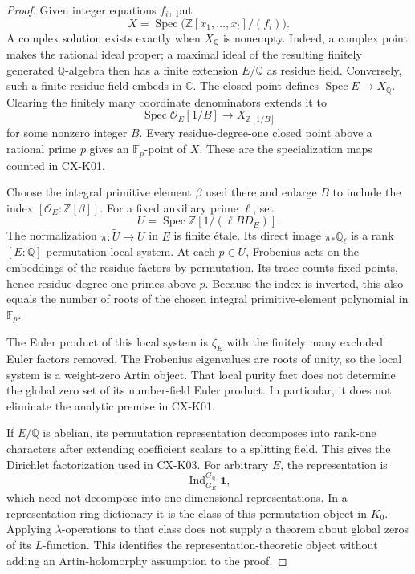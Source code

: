 \documentclass[11pt,a4paper]{article}
\begin{document}
\begin{proof}
Given integer equations $f_i$, put
\[
 X=\operatorname{Spec}\bigl(\mathbb Z[x_1,\ldots,x_t]/(f_i)\bigr).
\]
A complex solution exists exactly when $X_{\mathbb Q}$ is nonempty.
Indeed, a complex point makes the rational ideal proper; a maximal
ideal of the resulting finitely generated $\mathbb Q$-algebra then
has a finite extension $E/\mathbb Q$ as residue field. Conversely,
such a finite residue field embeds in $\mathbb C$. The closed point
defines $\operatorname{Spec}E\to X_{\mathbb Q}$. Clearing the finitely
many coordinate denominators extends it to
\[
 \operatorname{Spec}\mathcal O_E[1/B]
     \longrightarrow X_{\mathbb Z[1/B]}
\]
for some nonzero integer $B$. Every residue-degree-one closed point
above a rational prime $p$ gives an $\mathbb F_p$-point of $X$.
These are the specialization maps counted in CX-K01.

Choose the integral primitive element $\beta$ used there and enlarge
$B$ to include the index $[\mathcal O_E:\mathbb Z[\beta]]$.
For a fixed auxiliary prime $\ell$, set
\[
 U=\operatorname{Spec}\mathbb Z[1/(\ell B D_E)].
\]
The normalization $\pi:\widetilde U\to U$ in $E$ is finite
\'etale. Its direct image $\pi_*\mathbb Q_\ell$ is a rank
$[E:\mathbb Q]$ permutation local system. At each $p\in U$,
Frobenius acts on the embeddings of the residue factors by
permutation. Its trace counts fixed points, hence residue-degree-one
primes above $p$. Because the index is inverted, this also equals the
number of roots of the chosen integral primitive-element polynomial
in $\mathbb F_p$.

The Euler product of this local system is $\zeta_E$ with the finitely
many excluded Euler factors removed. The Frobenius eigenvalues are
roots of unity, so the local system is a weight-zero Artin object.
That local purity fact does not determine the global zero set of its
number-field Euler product. In particular, it does not eliminate the
analytic premise in CX-K01.

If $E/\mathbb Q$ is abelian, its permutation representation decomposes
into rank-one characters after extending coefficient scalars to a
splitting field. This gives the Dirichlet factorization used in
CX-K03. For arbitrary $E$, the representation is
\[
 \operatorname{Ind}_{G_E}^{G_{\mathbb Q}}\mathbf1,
\]
which need not decompose into one-dimensional representations.
In a representation-ring dictionary it is the class of this
permutation object in $K_0$. Applying $\lambda$-operations to that
class does not supply a theorem about global zeros of its $L$-function.
This identifies the representation-theoretic object without adding
an Artin-holomorphy assumption to the proof.


\end{proof}
\end{document}

